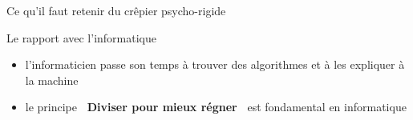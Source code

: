 \documentclass[final,hyperref={pdfpagelabels=false}]{beamer}
\renewenvironment{Coupe}{   }{   }
\renewcommand*{\tiny}{\fontsize{\resulttinyX}{\resulttinyY}\selectfont}
\renewcommand*{\footnotesize}{\fontsize{\resultfootnotesizeX}{\resultfootnotesizeY}\selectfont}
\begin{document}
\begin{Coupe}
\begin{frame}{Ce qu'il faut retenir du  crêpier psycho-rigide}
  \begin{block}{Le rapport avec l'informatique}
    \begin{itemize}
    \item l'informaticien passe son temps à trouver des algorithmes et  à les
    expliquer à la machine
    \item le principe \alert{\textbf{\og~Diviser pour mieux régner~\fg}} est
    fondamental en informatique
    \end{itemize}
  \end{block}
\end{frame}
\end{Coupe}
\newcommand{\maisonPair}[5]{  \begin{tikzpicture}
    \node[name=m,shape=regular polygon,regular polygon sides=#3,minimum size=22mm,
          rotate=(360/#3)]{};
    \node[name=b,shape=regular polygon,regular polygon sides=#4,minimum size=14mm,
          rotate=(360/#4)/2]{};
    \foreach \base/\maison in {#5} {
      \draw[shift=(m.corner \base)]
         node[shape=ellipse,fill=\maison,draw=black,rotate=((360/#3)*(\base-1))+(360/#3/2)] {~~};
    }
    \foreach \bb in {1,...,#4} {
      \draw[shift=(b.corner \bb)] node[name=bb \bb]{};
    }
    \foreach \base/\maison in {#1} {
      \draw[shift=(b.corner \base)]
         node[name=bb \base,shape=circle,fill=\maison,draw=black,inner sep=.1]
         {~~~};
    }
    #2
  \end{tikzpicture}
}
\newcommand{\maisonImpair}[5]{  \begin{tikzpicture}
    \node[name=m,shape=regular polygon,regular polygon sides=#3,
          minimum size=22mm, inner sep=0pt]{};
    \node[name=b,shape=regular polygon,regular polygon sides=#4,minimum size=14mm]{};
    \foreach \base/\maison in {#5} {
      \draw[shift=(m.corner \base)]
         node[shape=ellipse,fill=\maison,draw=black,rotate=(360/#3)*(\base-1)] {~~};
    }
    \foreach \base/\maison in {#1} {
      \draw[shift=(b.corner \base)]
         node[shape=circle,fill=\maison,draw=black,inner sep=.1] {~~~};
    }
    \foreach \bb in {1,...,#4} {\draw[shift=(b.corner \bb)] node[name=bb \bb] {};}
    #2
  \end{tikzpicture}
}
\end{document}

